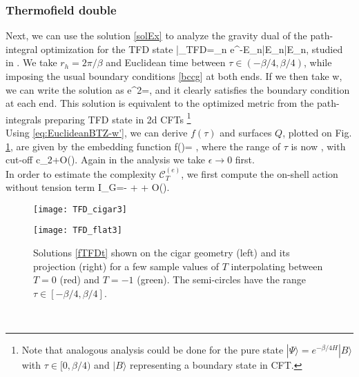 \documentclass[a4paper,12pt]{article}
\begin{document}
\subsubsection{Thermofield double}
Next, we can use the solution \eqref{solEx} to analyze the gravity dual of the path-integral optimization for the TFD  state
\be
|\Psi\rangle_{TFD}=\sum_n e^{-E_n}|E_n\rangle |E_n\rangle,
\ee
studied in \cite{Caputa:2017urj}. We take $r_h=2\pi/\beta$ and Euclidean time between $\tau\in (-\beta/4,\beta/4)$, while imposing the usual boundary conditions  \eqref{bccg} at both ends. If we then take
\be
w\in{},
\ee
we can write the solution as
\be
e^{2\phi}=,
\ee
and it clearly satisfies the boundary condition at each end. This solution is equivalent to the optimized metric from the path-integrals preparing TFD state in 2d CFTs \cite{Caputa:2017urj}\footnote{Note that analogous analysis could be done for the pure state $|\Psi\rangle =e^{-\beta/4 H}|B\rangle$ with $\tau\in[0,\beta/4)$ and $|B\rangle$ representing a boundary state in CFT.}\\
Using \eqref{eq:EuclideanBTZ-w'}, we can derive $f(\tau)$ and surfaces $Q$, plotted on Fig. \ref{TFDfigs}, are given by the embedding function
\be
f(\tau)= ,\label{fTFDt}
\ee
where the range of $\tau$ is now
\be
\tau\in{},
\ee
with cut-off
\be
c_2\simeq {}+O(\epsilon).
\ee
Again in the analysis we take $\epsilon\to0$ first.\\
In order to estimate the complexity $\mathcal{C}^{(e)}_T$, we first compute the on-shell action without tension term
\be
I_G=-  + 
 
+ O(\epsilon).
\ee
\begin{figure}[t!]
\centering
\begin{minipage}{.55\textwidth}
  \centering
  \texttt{[image: TFD\_cigar3]}
\end{minipage}%
\begin{minipage}{.5\textwidth}
  \centering
  \texttt{[image: TFD\_flat3]}
\end{minipage}
\caption{Solutions \eqref{fTFDt} shown on the cigar geometry (left) and its projection (right) for a few sample values of $T$ interpolating between $T=0$ (red) and $T=-1$ (green). The semi-circles have the range $\tau\in [-\beta/4,\beta/4]$.}
  \label{TFDfigs}
\end{figure}\\
\end{document}
